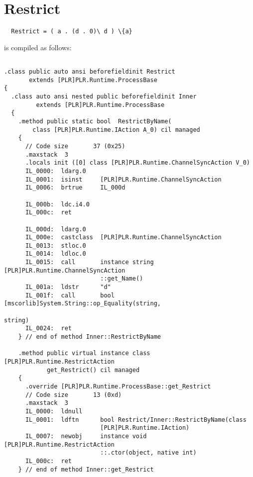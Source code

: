\section{Restrict}

	\begin{verbatim}
  Restrict = ( a . (d . 0)\ d ) \{a}
	\end{verbatim}
	
	is compiled as follows:

\begin{lstlisting}

.class public auto ansi beforefieldinit Restrict
       extends [PLR]PLR.Runtime.ProcessBase
{
  .class auto ansi nested public beforefieldinit Inner
         extends [PLR]PLR.Runtime.ProcessBase
  {
    .method public static bool  RestrictByName(
        class [PLR]PLR.Runtime.IAction A_0) cil managed
    {
      // Code size       37 (0x25)
      .maxstack  3
      .locals init ([0] class [PLR]PLR.Runtime.ChannelSyncAction V_0)
      IL_0000:  ldarg.0
      IL_0001:  isinst     [PLR]PLR.Runtime.ChannelSyncAction
      IL_0006:  brtrue     IL_000d

      IL_000b:  ldc.i4.0
      IL_000c:  ret

      IL_000d:  ldarg.0
      IL_000e:  castclass  [PLR]PLR.Runtime.ChannelSyncAction
      IL_0013:  stloc.0
      IL_0014:  ldloc.0
      IL_0015:  call       instance string [PLR]PLR.Runtime.ChannelSyncAction
                           ::get_Name()
      IL_001a:  ldstr      "d"
      IL_001f:  call       bool [mscorlib]System.String::op_Equality(string,
                                                                     string)
      IL_0024:  ret
    } // end of method Inner::RestrictByName

    .method public virtual instance class [PLR]PLR.Runtime.RestrictAction 
            get_Restrict() cil managed
    {
      .override [PLR]PLR.Runtime.ProcessBase::get_Restrict
      // Code size       13 (0xd)
      .maxstack  3
      IL_0000:  ldnull
      IL_0001:  ldftn      bool Restrict/Inner::RestrictByName(class 
                           [PLR]PLR.Runtime.IAction)
      IL_0007:  newobj     instance void [PLR]PLR.Runtime.RestrictAction
                           ::.ctor(object, native int)
      IL_000c:  ret
    } // end of method Inner::get_Restrict


\end{lstlisting}
